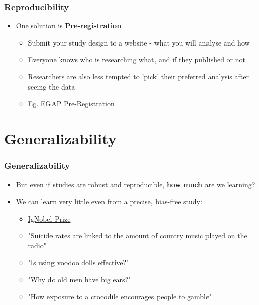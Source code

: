 \documentclass[xcolor=x11names,compress]{beamer}\usepackage[]{graphicx}\usepackage[]{xcolor}
\renewcommand{\(}{\begin{columns}}
\renewcommand{\)}{\end{columns}}
\newcommand{\<}[1]{\begin{column}{#1}}
\renewcommand{\>}{\end{column}}
\begin{document}



\begin{frame}
\frametitle{Reproducibility}
\begin{itemize}
\item One solution is \textbf{Pre-registration}
\pause
\begin{itemize}
\item Submit your study design to a website - what you will analyse and how
\pause
\item Everyone knows who is researching what, and if they published or not
\pause
\item Researchers are also less tempted to 'pick' their preferred analysis after seeing the data
\pause
\item Eg. \href{https://egap.org/content/registration}{EGAP Pre-Registration}
\end{itemize}
\end{itemize}
\end{frame}

\section{Generalizability}

\begin{frame}
\frametitle{Generalizability}
\begin{itemize}
\item But even if studies are robust and reproducible, \textbf{how much} are we learning?
\pause
\item We can learn very little even from a precise, bias-free study:
\pause
\begin{itemize}
\item \href{https://www.improbable.com/ig/winners}{IgNobel Prize}
\item "Suicide rates are linked to the amount of country music played on the radio"
\item "Is using voodoo dolls effective?"
\item "Why do old men have big ears?"
\item "How exposure to a crocodile encourages people to gamble"
\end{itemize}
\end{itemize}
\end{frame}
\end{document}
